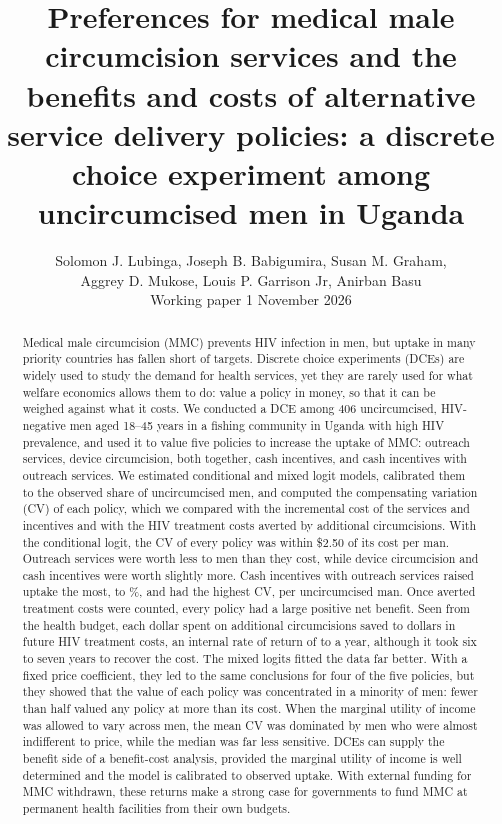 \documentclass[11pt]{article}
\title{{\slabfont Preferences for medical male circumcision services and the benefits and costs of alternative service delivery policies: a discrete choice experiment among uncircumcised men in Uganda}}
\author{\textsf{Solomon J. Lubinga, Joseph B. Babigumira, Susan M. Graham,}\\
  \textsf{Aggrey D. Mukose, Louis P. Garrison Jr, Anirban Basu}\\[0.4em]
  \small\textsf{Working paper \textperiodcentered{} 1 November 2026}}
\date{}
\numberwithin{equation}{section}\numberwithin{figure}{section}\numberwithin{table}{section}
\begin{document}
\maketitle
\thispagestyle{plain}

\begin{abstract}
\noindent Medical male circumcision (MMC) prevents HIV infection in men, but uptake in many priority countries has fallen short of targets. Discrete choice experiments (DCEs) are widely used to study the demand for health services, yet they are rarely used for what welfare economics allows them to do: value a policy in money, so that it can be weighed against what it costs. We conducted a DCE among 406 uncircumcised, HIV-negative men aged 18--45 years in a fishing community in Uganda with high HIV prevalence, and used it to value five policies to increase the uptake of MMC: outreach services, device circumcision, both together, cash incentives, and cash incentives with outreach services. We estimated conditional and mixed logit models, calibrated them to the observed share of uncircumcised men, and computed the compensating variation (CV) of each policy, which we compared with the incremental cost of the services and incentives and with the HIV treatment costs averted by additional circumcisions. With the conditional logit, the CV of every policy was within \$2.50 of its cost per man. Outreach services were worth less to men than they cost, while device circumcision and cash incentives were worth slightly more. Cash incentives with outreach services raised uptake the most, to \mmcPFiveUptake\%, and had the highest CV, \mmcPFiveCV{} per uncircumcised man. Once averted treatment costs were counted, every policy had a large positive net benefit. Seen from the health budget, each dollar spent on additional circumcisions saved \mmcBreturnMin{} to \mmcBreturnMax{} dollars in future HIV treatment costs, an internal rate of return of \mmcBirrMin{} to \mmcBirrMax{} a year, although it took six to seven years to recover the cost. The mixed logits fitted the data far better. With a fixed price coefficient, they led to the same conclusions for four of the five policies, but they showed that the value of each policy was concentrated in a minority of men: fewer than half valued any policy at more than its cost. When the marginal utility of income was allowed to vary across men, the mean CV was dominated by men who were almost indifferent to price, while the median was far less sensitive. DCEs can supply the benefit side of a benefit-cost analysis, provided the marginal utility of income is well determined and the model is calibrated to observed uptake. With external funding for MMC withdrawn, these returns make a strong case for governments to fund MMC at permanent health facilities from their own budgets.
\end{abstract}
\end{document}
